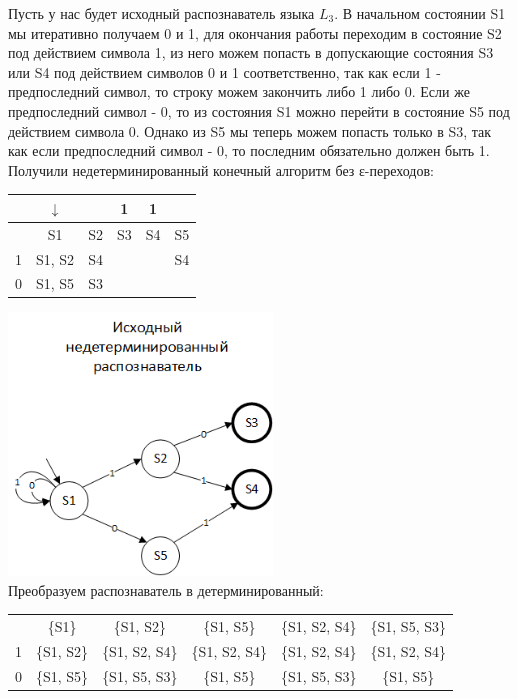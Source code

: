 \documentclass[a4paper,14pt]{extarticle}
\begin{document}
\begin{enumerate}[1.]
Пусть у нас будет исходный распознаватель языка $L_3$. В начальном состоянии S1 мы итеративно 
получаем 0 и 1, для окончания работы переходим в состояние S2 под действием символа
1, из него можем попасть в допускающие состояния S3 или S4 под действием символов 0 и 1 соответственно, 
так как если 1 - предпоследний символ, то строку можем закончить либо 1 либо 0. 
Если же предпоследний символ - 0, то из состояния S1 можно перейти в состояние S5 
под действием символа 0. Однако из S5 мы теперь можем попасть только в S3, так как если предпоследний 
символ - 0, то последним обязательно должен быть 1. Получили недетерминированный конечный алгоритм
без ε-переходов:\\
\begin{tabular}{|c|c|c|c|c|c|}
    \hline
    & $\downarrow$ & & 1 & 1 & \\
    \hline
    & S1 & S2 & S3 & S4 & S5 \\
    \hline
    1 & S1, S2 & S4 & & & S4 \\
    \hline
    0 & S1, S5 & S3 & & & \\
    \hline
\end{tabular}
\includegraphics[width=70mm]{task3_non_determined}\\

Преобразуем распознаватель в детерминированный:\\
\begin{tabular}{|c|c|c|c|c|c|}
    \hline
    & & & & &\\
    \hline
    & \{S1\} & \{S1, S2\} & \{S1, S5\} & \{S1, S2, S4\} & \{S1, S5, S3\}\\
    \hline
    1 & \{S1, S2\} & \{S1, S2, S4\} & \{S1, S2, S4\} & \{S1, S2, S4\} & \{S1, S2, S4\}\\
    \hline
    0 & \{S1, S5\} & \{S1, S5, S3\} & \{S1, S5\} & \{S1, S5, S3\} & \{S1, S5\}\\
    \hline
\end{tabular} 


\end{enumerate}
\end{document}
